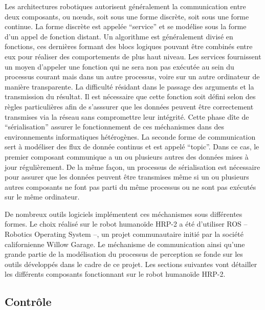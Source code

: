 Les architectures robotiques autorisent généralement la communication
entre deux composants, ou n\oe uds, soit sous une forme discrète, soit
sous une forme continue. La forme discrète est appelée
``service'' et se modélise sous la forme d'un appel de
fonction distant. Un algorithme est généralement divisé en fonctions,
ces dernières formant des blocs logiques pouvant être combinés entre
eux pour réaliser des comportements de plus haut niveau. Les services
fournissent un moyen d'appeler une fonction qui ne sera non pas
exécutée au sein du processus courant mais dans un autre processus,
voire sur un autre ordinateur de manière transparente. La difficulté
résidant dans le passage des arguments et la transmission du
résultat. Il est nécessaire que cette fonction soit défini selon des
règles particulières afin de s'asssurer que les données peuvent être
correctement transmises via la réseau sans compromettre leur
intégrité. Cette phase dîte de ``sérialisation''
assurer le fonctionnement de ces méchanismes dans des environnements
informatiques hétérogènes. La seconde forme de communication sert à
modéliser des flux de donnée continus et est appelé
``topic''. Dans ce cas, le premier composant communique a
un ou plusieurs autres des données mises à jour régulièrement. De la
même façon, un processus de sérialisation est nécessaire pour assurer
que les données peuvent être transmises même si un ou plusieurs autres
composants ne font pas parti du même processus ou ne sont pas exécutés
sur le même ordinateur.


De nombreux outils logiciels implémentent ces méchanismes sous
différentes formes. Le choix réalisé sur le robot humanoïde HRP-2 a
été d'utiliser ROS -- Robotics Operating System --, un
projet communautaire initié par la société californienne Willow
Garage. Le méchanisme de communication ainsi
qu'une grande partie de la modélisation du processus de perception se
fonde sur les outils développés dans le cadre de ce projet. Les
sections suivantes vont détailler les différents composants
fonctionnant sur le robot humanoïde HRP-2.



\subsection{Contrôle}

